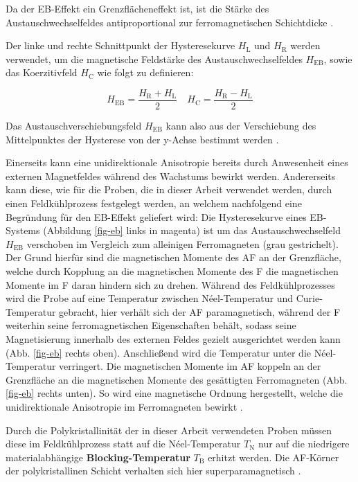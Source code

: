 \documentclass[page,pdftex,12pt,a4paper,twoside,openright]{scrbook}
\begin{document}
Da der EB-Effekt ein Grenzflächeneffekt ist, ist die Stärke des Austauschwechselfeldes antiproportional zur ferromagnetischen Schichtdicke \cite{hohler_exchange_2008}.

Der linke und rechte Schnittpunkt der Hysteresekurve \(H_\mathrm{L}\) und \(H_\mathrm{R}\) werden verwendet, um die magnetische Feldstärke des Austauschwechselfeldes \(H_\mathrm{EB}\), sowie das Koerzitivfeld \(H_\mathrm{C}\) wie folgt zu definieren:

\begin{equation}
H_\mathrm{EB} = \frac{H_\mathrm{R}+ H_\mathrm{L}}{2} \quad H_\mathrm{C} = \frac{H_\mathrm{R} - H_\mathrm{L}}{2}
\end{equation}

Das Austauschverschiebungsfeld \(H_\mathrm{EB}\) kann also aus der Verschiebung des Mittelpunktes der Hysterese von der y-Achse bestimmt werden \cite{meiklejohn_new_1957}. 

Einerseits kann eine unidirektionale Anisotropie bereits durch Anwesenheit eines externen Magnetfeldes während des Wachstums bewirkt werden. Andererseits kann diese, wie für die Proben, die in dieser Arbeit verwendet werden, durch einen Feldkühlprozess festgelegt werden, an welchem nachfolgend eine Begründung für den EB-Effekt geliefert wird: Die Hysteresekurve eines EB-Systems (Abbildung \ref{fig-eb} links in magenta) ist um das Austauschwechselfeld \(H_\mathrm{EB}\) verschoben im Vergleich zum alleinigen Ferromagneten (grau gestrichelt). Der Grund hierfür sind die magnetischen Momente des AF an der Grenzfläche, welche durch Kopplung an die magnetischen Momente des F die magnetischen Momente im F daran hindern sich zu drehen. Während des Feldkühlprozesses wird die Probe auf eine Temperatur zwischen Néel-Temperatur und Curie-Temperatur gebracht, hier verhält sich der AF paramagnetisch, während der F weiterhin seine ferromagnetischen Eigenschaften behält, sodass seine Magnetisierung innerhalb des externen Feldes gezielt ausgerichtet werden kann (Abb. \ref{fig-eb} rechts oben). Anschließend wird die Temperatur unter die Néel-Temperatur verringert. Die magnetischen Momente im AF koppeln an der Grenzfläche an die magnetischen Momente des gesättigten Ferromagneten (Abb. \ref{fig-eb} rechts unten). So wird eine magnetische Ordnung hergestellt, welche die unidirektionale Anisotropie im Ferromagneten bewirkt \cite{merkel_einfluss_2018}.

Durch die Polykristallinität der in dieser Arbeit verwendeten Proben müssen diese im Feldkühlprozess statt auf die Néel-Temperatur \(T_\mathrm{N}\) nur auf die niedrigere materialabhängige \textbf{Blocking-Temperatur} \(T_\mathrm{B}\) erhitzt werden. Die AF-Körner der polykristallinen Schicht verhalten sich hier superparamagnetisch \cite{ogrady_new_2010,bean_superparamagnetism_1959}.
\end{document}
